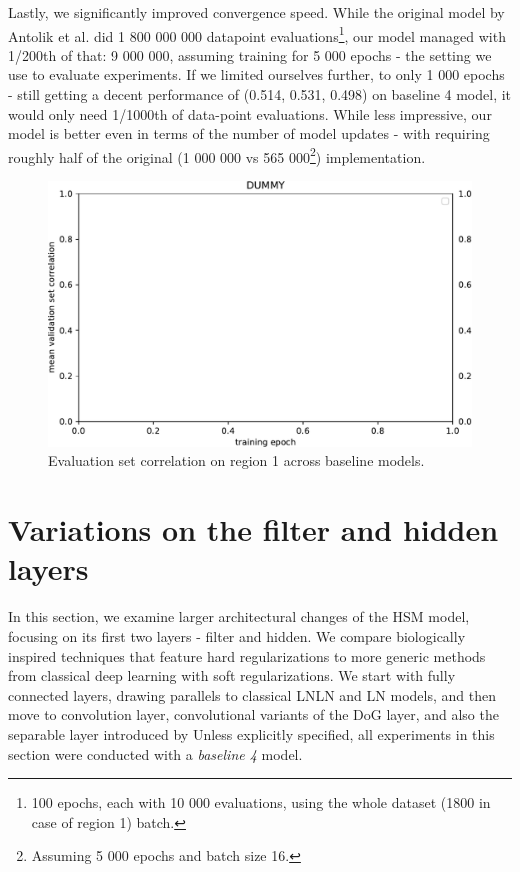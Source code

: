 Lastly, we significantly improved convergence speed. While the original model by Antolik et al. did 1 800 000 000 datapoint evaluations\footnote{100 epochs, each with 10 000 evaluations, using the whole dataset (1800 in case of region 1) batch.}, our model managed with 1/200th of that: 9 000 000, assuming training for 5 000 epochs - the setting we use to evaluate experiments. If we limited ourselves further, to only 1 000 epochs - still getting a decent performance of (0.514, 0.531, 0.498) on baseline 4 model, it would only need 1/1000th of data-point evaluations. While less impressive, our model is better even in terms of the number of model updates - with requiring roughly half of the original (1 000 000 vs 565 000\footnote{Assuming 5 000 epochs and batch size 16.}) implementation.

\begin{figure}[H]
    \centering
    \includegraphics[width=1\textwidth]{../figures/05_dummy}
    \caption[Baseline models on region 1]{Evaluation set correlation on region 1 across baseline models.}
    \label{fig:5.1.5}
\end{figure}


\section{Variations on the filter and hidden layers}
In this section, we examine larger architectural changes of the HSM model, focusing on its first two layers - filter and hidden. We compare biologically inspired techniques that feature hard regularizations to more generic methods from classical deep learning with soft regularizations. We start with fully connected layers, drawing parallels to classical LNLN and LN models, and then move to convolution layer, convolutional variants of the DoG layer, and also the separable layer introduced by \cite{klidnt} Unless explicitly specified, all experiments in this section were conducted with a \textit{baseline 4} model.

